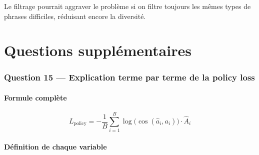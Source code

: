 \documentclass[11pt,a4paper]{article}
\begin{document}
Le filtrage pourrait aggraver le problème si on filtre toujours les mêmes types de phrases difficiles, réduisant encore la diversité.

\newpage
\part{Questions supplémentaires}

\section{Question 15 — Explication terme par terme de la policy loss}

\subsection{Formule complète}

\begin{equation}
L_{\text{policy}} = -\frac{1}{B}\sum_{i=1}^{B} \log\!\big(\cos(\hat{a}_i, a_i)\big) \cdot \hat{A}_i
\end{equation}

\subsection{Définition de chaque variable}
\end{document}
